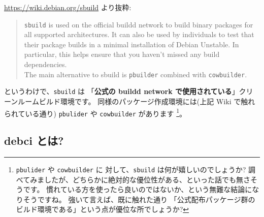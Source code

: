\documentclass[mingoth,a4paper]{jsarticle}
\begin{document}
\url{https://wiki.debian.org/sbuild} より抜粋:
\begin{quote}
  \texttt{sbuild} is used on the official buildd network to build binary
  packages for all supported architectures.
  It can also be used by individuals to test that their package builds
  in a minimal installation of Debian Unstable.
  In particular, this helps ensure that you haven't missed any build
  dependencies.
  \\[1em]
  The main alternative to sbuild is \texttt{pbuilder} combined with \texttt{cowbuilder}.
\end{quote}
というわけで、\texttt{sbuild} は
「\textbf{公式の buildd network で使用されている}」クリーンルームビルド環境です。
同様のパッケージ作成環境には(上記 Wiki で触れられている通り)
\texttt{pbulider} や \texttt{cowbuilder} があります
\footnote{%
  \texttt{pbulider} や \texttt{cowbuilder} に
  対して、\texttt{sbuild} は何が嬉しいのでしょうか?
  調べてみましたが、どちらかに絶対的な優位性がある、といった話でも無さそうです。
  慣れている方を使ったら良いのではないか、という無難な結論になりそうですね。
  強いて言えば、既に触れた通り
  「公式配布パッケージ群のビルド環境である」という点が優位な所でしょうか?
}。

\subsection*{debci とは?}
\end{document}
